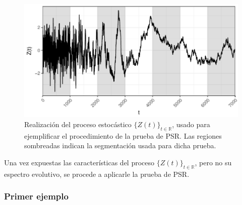 \documentclass[12pt,letterpaper]{book}
\newcommand{\R}{\mathbb{R}}
\begin{document}
\begin{figure}
\centering
\includegraphics[width=0.9\linewidth]{./scripts_graf_res/proceso_Z.pdf}
\caption[Realización de un proceso estocástico, usado para ejemplificar la prueba de PSR.]{Realización del proceso estocástico $\{Z(t)\}_{t\in\R}$, usado para ejemplificar el procedimiento de la prueba de PSR.
Las regiones sombreadas indican la segmentación usada para dicha prueba.}
\label{fig:lazy21}
\end{figure}

Una vez expuestas las características del proceso $\{Z(t)\}_{t\in\R}$, pero no su espectro evolutivo, se procede a aplicarle la prueba de PSR.

\subsubsection{Primer ejemplo}
\end{document}
